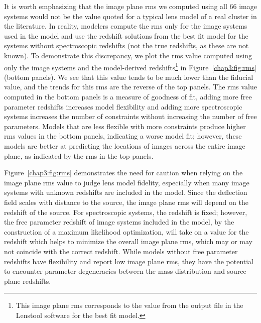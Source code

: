 It is worth emphasizing that the image plane rms we computed using all 66 image systems would not be the value quoted for a typical lens model of a real cluster in the literature. In reality, modelers compute the rms only for the image systems used in the model and use the redshift solutions from the best fit model for the systems without spectroscopic redshifts (not the true redshifts, as these are not known). To demonstrate this discrepancy, we plot the rms value computed using only the image systems and the model-derived redshifts\footnote{This image plane rms corresponds to the value from the output file in the Lenstool software for the best fit model.} in Figure~\ref{chap3:fig:rms} (bottom panels). We see that this value tends to be much lower than the fiducial value, and the trends for this rms are the reverse of the top panels. The rms value computed in the bottom panels is a measure of goodness of fit, adding more free parameter redshifts increases model flexibility and adding more spectroscopic systems increases the number of constraints without increasing the number of free parameters. Models that are less flexible with more constraints produce higher rms values in the bottom panels, indicating a worse model fit; however, these models are better at predicting the locations of images across the entire image plane, as indicated by the rms in the top panels.

Figure~\ref{chap3:fig:rms} demonstrates the need for caution when relying on the image plane rms value to judge lens model fidelity, especially when many image systems with unknown redshifts are included in the model. Since the deflection field scales with distance to the source, the image plane rms will depend on the redshift of the source. For spectroscopic systems, the redshift is fixed; however, the free parameter redshift of image systems included in the model, by the construction of a maximum likelihood optimization, will take on a value for the redshift which helps to minimize the overall image plane rms, which may or may not coincide with the correct redshift. While models without free parameter redshifts have flexibility and report low image plane rms, they have the potential to encounter parameter degeneracies between the mass distribution and source plane redshifts.

